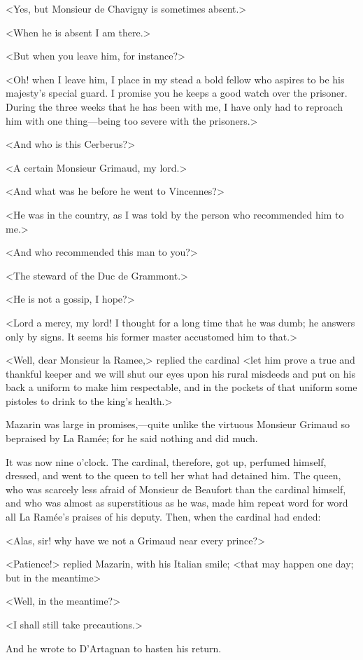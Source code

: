 <Yes, but Monsieur de Chavigny is sometimes absent.>

<When he is absent I am there.>

<But when you leave him, for instance?>

<Oh! when I leave him, I place in my stead a bold fellow who aspires to be his majesty's special guard. I promise you he keeps a good watch over the prisoner. During the three weeks that he has been with me, I have only had to reproach him with one thing—being too severe with the prisoners.>

<And who is this Cerberus?>

<A certain Monsieur Grimaud, my lord.>

<And what was he before he went to Vincennes?>

<He was in the country, as I was told by the person who recommended him to me.>

<And who recommended this man to you?>

<The steward of the Duc de Grammont.>

<He is not a gossip, I hope?>

<Lord a mercy, my lord! I thought for a long time that he was dumb; he answers only by signs. It seems his former master accustomed him to that.>

<Well, dear Monsieur la Ramee,> replied the cardinal <let him prove a true and thankful keeper and we will shut our eyes upon his rural misdeeds and put on his back a uniform to make him respectable, and in the pockets of that uniform some pistoles to drink to the king's health.>

Mazarin was large in promises,—quite unlike the virtuous Monsieur Grimaud so bepraised by La Ramée; for he said nothing and did much.

It was now nine o'clock. The cardinal, therefore, got up, perfumed himself, dressed, and went to the queen to tell her what had detained him. The queen, who was scarcely less afraid of Monsieur de Beaufort than the cardinal himself, and who was almost as superstitious as he was, made him repeat word for word all La Ramée's praises of his deputy. Then, when the cardinal had ended:

<Alas, sir! why have we not a Grimaud near every prince?>

<Patience!> replied Mazarin, with his Italian smile; <that may happen one day; but in the meantime\longdash>

<Well, in the meantime?>

<I shall still take precautions.>

And he wrote to D'Artagnan to hasten his return. 
